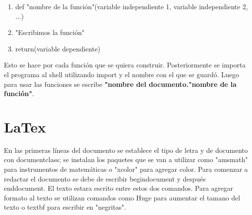 \documentclass[letter paper, 12pt, oneside]{article}
\begin{document}
\begin{enumerate}
\item{def "nombre de la función"(variable independiente 1, variable independiente 2, ...)}

\item{"Escribimos la función"}


\item{return(variable dependiente)} 

\end{enumerate}
Esto se hace por cada función que se quiera construir. Posteriormente se importa el programa al shell utilizando import y el nombre con el que se guardó. Luego para usar las funciones se escribe \textbf{"nombre del documento."nombre de la función"}.

\section{LaTex}


En las primeras líneas del documento se establece el tipo de letra y de documento con documentclass; se instalan los paquetes que se van a utilizar como "amsmath" para instrumentos de matemáticas o "xcolor" para agregar color. 
Para comenzar a redactar el documento se debe de escribir begin{document} y después end{document}. El texto estara escrito entre estos dos comandos. 
Para agregar formato al texto se utilizan comandos como Huge para aumentar el tamano del texto o textbf para escribir en "negritas". 
\end{document}
